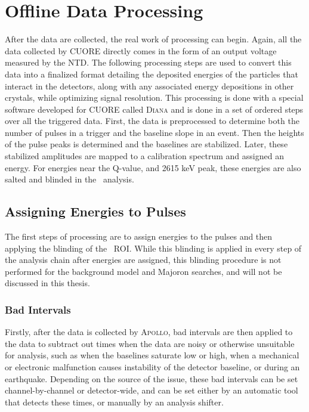 \section{Offline Data Processing}
After the data are collected, the real work of processing can begin.
Again, all the data collected by CUORE directly comes in the form of an output voltage measured by the NTD.
The following processing steps are used to convert this data into a finalized format detailing the deposited energies of the particles that interact in the detectors, along with any associated energy depositions in other crystals, while optimizing signal resolution.
This processing is done with a special software developed for CUORE called \textsc{Diana} and is done in a set of ordered steps over all the triggered data.
First, the data is preprocessed to determine both the number of pulses in a trigger and the baseline slope in an event. 
Then the heights of the pulse peaks is determined and the baselines are stabilized.
Later, these stabilized amplitudes are mapped to a calibration spectrum and assigned an energy.
For energies near the \zeronubb Q-value, and 2615 keV peak, these energies are also salted and blinded in the \zeronubb~analysis.

\subsection*{Assigning Energies to Pulses}
The first steps of processing are to assign energies to the pulses and then applying the blinding of the \zeronubb~ROI.
While this blinding is applied in every step of the analysis chain after energies are assigned, this blinding procedure is not performed for the background model and Majoron searches, and will not be discussed in this thesis.

\subsubsection*{Bad Intervals}
\label{ssec:Bad Intervals}
Firstly, after the data is collected by \textsc{Apollo}, bad intervals are then applied to the data to subtract out times when the data are noisy or otherwise unsuitable for analysis, such as when the baselines saturate low or high, when a mechanical or electronic malfunction causes instability of the detector baseline, or during an earthquake.
Depending on the source of the issue, these bad intervals can be set channel-by-channel or detector-wide, and can be set either by an automatic tool that detects these times, or manually by an analysis shifter.

